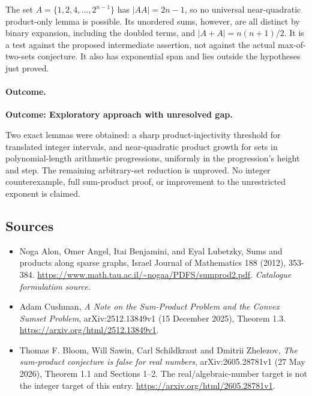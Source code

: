 \documentclass[11pt,a4paper]{article}
\numberwithin{equation}{section}
\begin{document}
The set $A=\{1,2,4,\ldots,2^{n-1}\}$ has $|AA|=2n-1$, so no universal
near-quadratic product-only lemma is possible. Its unordered sums, however,
are all distinct by binary expansion, including the doubled terms, and
$|A+A|=n(n+1)/2$. It is a test against the proposed intermediate assertion,
not against the actual max-of-two-sets conjecture. It also has exponential
span and lies outside the hypotheses just proved.

\paragraph{Outcome.}
\textbf{Outcome: Exploratory approach with unresolved gap.}

Two exact lemmas were obtained: a sharp product-injectivity threshold for
translated integer intervals, and near-quadratic product growth for sets
in polynomial-length arithmetic progressions, uniformly in the progression's
height and step. The remaining arbitrary-set reduction is unproved.
No integer counterexample, full sum-product proof, or improvement to the
unrestricted exponent is claimed.
\subsection{Sources}
\begin{itemize}\raggedright
\item[\textnormal{[S1]}]\hypertarget{source:113:1}{} Noga Alon, Omer Angel, Itai Benjamini, and Eyal Lubetzky, Sums and products along sparse graphs, Israel Journal of Mathematics 188 (2012), 353-384.
\url{https://www.math.tau.ac.il/~nogaa/PDFS/sumprod2.pdf}.
{\small\textit{Catalogue formulation source.}}
\item[\textnormal{[E1]}]\hypertarget{extra:113:1}{} Adam Cushman,
\emph{A Note on the Sum-Product Problem and the Convex Sumset Problem},
arXiv:2512.13849v1 (15 December 2025), Theorem 1.3.
\url{https://arxiv.org/html/2512.13849v1}.
\item[\textnormal{[E2]}]\hypertarget{extra:113:2}{} Thomas F. Bloom, Will Sawin,
Carl Schildkraut and Dmitrii Zhelezov,
\emph{The sum-product conjecture is false for real numbers},
arXiv:2605.28781v1 (27 May 2026), Theorem 1.1 and Sections 1--2.
The real/algebraic-number target is not the integer target of this entry.
\url{https://arxiv.org/html/2605.28781v1}.
\end{itemize}
\end{document}
